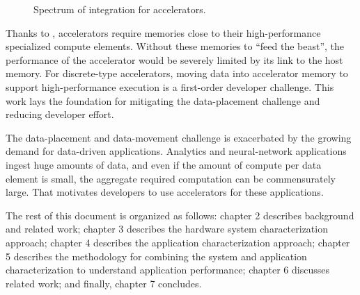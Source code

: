 \begin{figure}
    \centering
    \caption{Spectrum of integration for accelerators.}
    \label{fig:integration-spectrum}
\end{figure}

Thanks to , accelerators require memories close to their high-performance specialized compute elements.
Without these memories to ``feed the beast'', the performance of the accelerator would be severely limited by its link to the host memory.
For discrete-type accelerators, moving data into accelerator memory to support high-performance execution is a first-order developer challenge.
This work lays the foundation for mitigating the data-placement challenge and reducing developer effort.

The data-placement and data-movement challenge is exacerbated by the growing demand for data-driven applications.
Analytics and neural-network applications ingest huge amounts of data, and even if the amount of compute per data element is small, the aggregate required computation can be commensurately large.
That motivates developers to use accelerators for these applications.


The rest of this document is organized as follows:
chapter 2 describes background and related work;
chapter 3 describes the hardware system characterization approach;
chapter 4 describes the application characterization approach;
chapter 5 describes the methodology for combining the system and application characterization to understand application performance;
chapter 6 discusses related work;
and finally, chapter 7 concludes.

